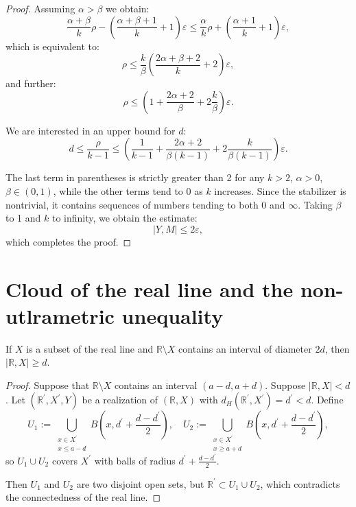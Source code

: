 \documentclass[leqno]{article}
\begin{document}
\begin{proof}
Assuming $\alpha > \beta$ we obtain:
$$
\frac{\alpha+\beta}{k}\rho - \left(\frac{\alpha+\beta+1}{k}+1\right)\varepsilon \leq \frac{\alpha}{k}\rho + \left(\frac{\alpha+1}{k} + 1\right)\varepsilon,
$$
which is equivalent to:
$$
\rho \leq \frac{k}{\beta}\left(\frac{2\alpha+\beta+2}{k}+2\right)\varepsilon,
$$
and further:
$$
\rho \leq \left(1+\frac{2\alpha + 2}{\beta} + 2\frac{k}{\beta}\right)\varepsilon.
$$

We are interested in an upper bound for $d$:
$$
d \leq \frac{\rho}{k-1} \leq \left(\frac{1}{k-1}+\frac{2\alpha + 2}{\beta(k-1)} + 2\frac{k}{\beta(k-1)}\right)\varepsilon.
$$

The last term in parentheses is strictly greater than 2 for any $k>2$, $\alpha>0$, $\beta\in (0,1)$, while the other terms tend to 0 as $k$ increases. Since the stabilizer is nontrivial, it contains sequences of numbers tending to both 0 and $\infty$. Taking $\beta$ to 1 and $k$ to infinity, we obtain the estimate:
$$
|Y, M| \leq 2\varepsilon,
$$
which completes the proof.
\end{proof}

\section{Cloud of the real line and the non-utlrametric unequality}

\begin{lemma}\label{lemmaDiamDist}
  If $X$ is a subset of the real line and $\mathbb{R}\setminus X$ contains an interval of diameter $2d$, then $|\mathbb{R}, X| \ge d$.
\end{lemma}

\begin{proof}
Suppose that
$\mathbb{R} \setminus X$ contains an interval $(a-d, a+d)$. Suppose $|\mathbb{R}, X|<d$. Let $(\mathbb{R}^{\prime}, X^{\prime}, Y)$ be a realization of $(\mathbb{R}, X)$ with $d_H(\mathbb{R}^{\prime}, X^{\prime}) = d^{\prime}<d$. Define
$$
U_1 := \bigcup_{\substack{x \in X^{\prime} \\ x \leq a-d}} B\left(x, d^{\prime}+\frac{d-d^{\prime}}{2}\right), \quad 
U_2 := \bigcup_{\substack{x \in X^{\prime} \\ x \geq a+d}} B\left(x, d^{\prime}+\frac{d-d^{\prime}}{2}\right),
$$
so $U_1 \cup U_2$ covers $X^{\prime}$ with balls of radius $d^\prime + \frac{d-d^{\prime}}{2}$. 

Then $U_1$ and $U_2$ are two disjoint open sets, but $\mathbb{R}^{\prime} \subset U_1 \cup U_2$, which contradicts the connectedness of the real line.
\end{proof}
\end{document}
